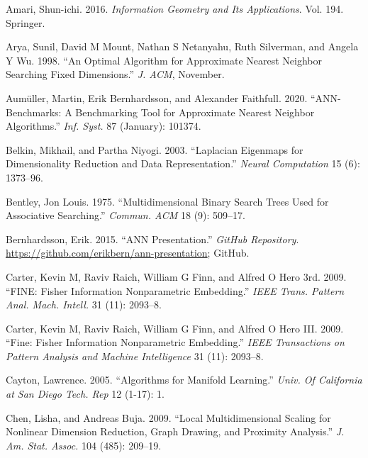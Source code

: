 \documentclass[12pt]{article}
\newlength{\cslhangindent}
\newenvironment{cslreferences}%
  {\setlength{\parindent}{0pt}%
  \everypar{\setlength{\hangindent}{\cslhangindent}}\ignorespaces}%
  {\par}
\begin{document}
\hypertarget{refs}{}
\begin{cslreferences}
\leavevmode\hypertarget{ref-amari2016}{}%
Amari, Shun-ichi. 2016. \emph{Information Geometry and Its Applications}. Vol. 194. Springer.

\leavevmode\hypertarget{ref-AryaSunil1998-nd}{}%
Arya, Sunil, David M Mount, Nathan S Netanyahu, Ruth Silverman, and Angela Y Wu. 1998. ``An Optimal Algorithm for Approximate Nearest Neighbor Searching Fixed Dimensions.'' \emph{J. ACM}, November.

\leavevmode\hypertarget{ref-Aumuller2020-nk}{}%
Aumüller, Martin, Erik Bernhardsson, and Alexander Faithfull. 2020. ``ANN-Benchmarks: A Benchmarking Tool for Approximate Nearest Neighbor Algorithms.'' \emph{Inf. Syst.} 87 (January): 101374.

\leavevmode\hypertarget{ref-Belkin2003}{}%
Belkin, Mikhail, and Partha Niyogi. 2003. ``Laplacian Eigenmaps for Dimensionality Reduction and Data Representation.'' \emph{Neural Computation} 15 (6): 1373--96.

\leavevmode\hypertarget{ref-Bentley1975-zo}{}%
Bentley, Jon Louis. 1975. ``Multidimensional Binary Search Trees Used for Associative Searching.'' \emph{Commun. ACM} 18 (9): 509--17.

\leavevmode\hypertarget{ref-Bernhardsson2015-slides}{}%
Bernhardsson, Erik. 2015. ``ANN Presentation.'' \emph{GitHub Repository}. \url{https://github.com/erikbern/ann-presentation}; GitHub.

\leavevmode\hypertarget{ref-Carter2009-ti}{}%
Carter, Kevin M, Raviv Raich, William G Finn, and Alfred O Hero 3rd. 2009. ``FINE: Fisher Information Nonparametric Embedding.'' \emph{IEEE Trans. Pattern Anal. Mach. Intell.} 31 (11): 2093--8.

\leavevmode\hypertarget{ref-carter2009}{}%
Carter, Kevin M, Raviv Raich, William G Finn, and Alfred O Hero III. 2009. ``Fine: Fisher Information Nonparametric Embedding.'' \emph{IEEE Transactions on Pattern Analysis and Machine Intelligence} 31 (11): 2093--8.

\leavevmode\hypertarget{ref-Cayton2005-dp}{}%
Cayton, Lawrence. 2005. ``Algorithms for Manifold Learning.'' \emph{Univ. Of California at San Diego Tech. Rep} 12 (1-17): 1.

\leavevmode\hypertarget{ref-Chen2009-su}{}%
Chen, Lisha, and Andreas Buja. 2009. ``Local Multidimensional Scaling for Nonlinear Dimension Reduction, Graph Drawing, and Proximity Analysis.'' \emph{J. Am. Stat. Assoc.} 104 (485): 209--19.


\end{cslreferences}
\end{document}
